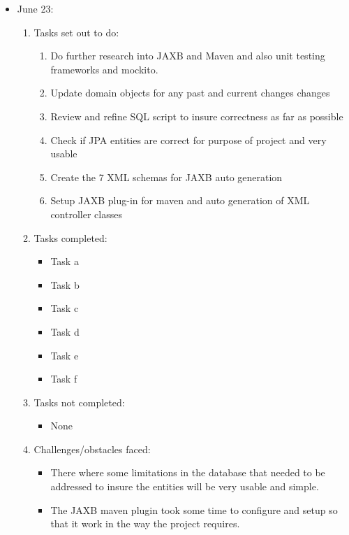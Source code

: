 	\begin{itemize}
		\item June 23:
		\begin{enumerate}
			\item Tasks set out to do:
			\begin{enumerate}
				\item Do further research into JAXB and Maven and also unit testing frameworks and mockito.
				\item Update domain objects for any past and current changes changes
				\item Review and refine SQL script to insure correctness as far as possible
				\item Check if JPA entities are correct for purpose of project and very usable
				\item Create the 7 XML schemas for JAXB auto generation
				\item Setup JAXB plug-in for maven and auto generation of XML controller classes 
			\end{enumerate}
			\item Tasks completed:
			\begin{itemize}
				\item Task a
				\item Task b
				\item Task c
				\item Task d
				\item Task e
				\item Task f
			\end{itemize}
			\item Tasks not completed:
			\begin{itemize}
				\item None
			\end{itemize}
			\item Challenges/obstacles faced:
			\begin{itemize}
				\item There where some limitations in the database that needed to be addressed to insure the entities will be very usable and simple.
				\item The JAXB maven plugin took some time to configure and setup so that it work in the way the project requires.
			\end{itemize}			
		\end{enumerate}
	\end{itemize}
	
